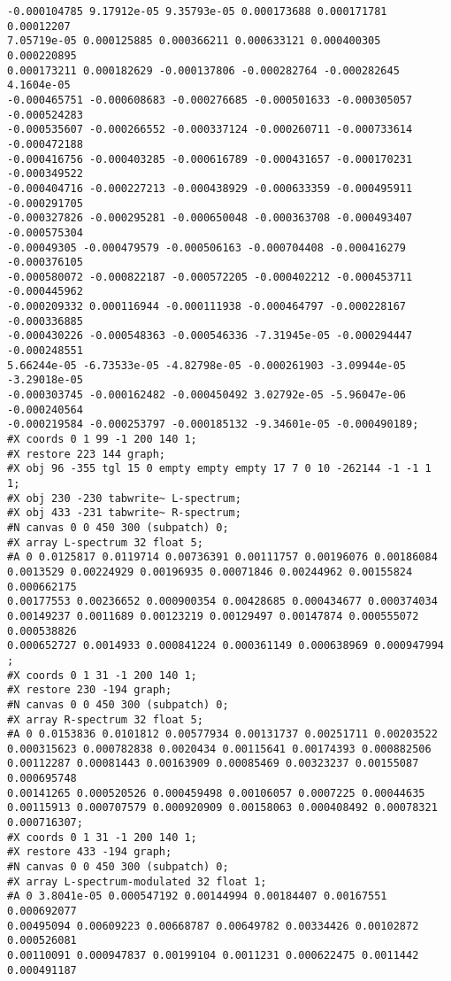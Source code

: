 \begin{itemize}
\begin{verbatim}
-0.000104785 9.17912e-05 9.35793e-05 0.000173688 0.000171781 0.00012207
7.05719e-05 0.000125885 0.000366211 0.000633121 0.000400305 0.000220895
0.000173211 0.000182629 -0.000137806 -0.000282764 -0.000282645 4.1604e-05
-0.000465751 -0.000608683 -0.000276685 -0.000501633 -0.000305057 -0.000524283
-0.000535607 -0.000266552 -0.000337124 -0.000260711 -0.000733614 -0.000472188
-0.000416756 -0.000403285 -0.000616789 -0.000431657 -0.000170231 -0.000349522
-0.000404716 -0.000227213 -0.000438929 -0.000633359 -0.000495911 -0.000291705
-0.000327826 -0.000295281 -0.000650048 -0.000363708 -0.000493407 -0.000575304
-0.00049305 -0.000479579 -0.000506163 -0.000704408 -0.000416279 -0.000376105
-0.000580072 -0.000822187 -0.000572205 -0.000402212 -0.000453711 -0.000445962
-0.000209332 0.000116944 -0.000111938 -0.000464797 -0.000228167 -0.000336885
-0.000430226 -0.000548363 -0.000546336 -7.31945e-05 -0.000294447 -0.000248551
5.66244e-05 -6.73533e-05 -4.82798e-05 -0.000261903 -3.09944e-05 -3.29018e-05
-0.000303745 -0.000162482 -0.000450492 3.02792e-05 -5.96047e-06 -0.000240564
-0.000219584 -0.000253797 -0.000185132 -9.34601e-05 -0.000490189;
#X coords 0 1 99 -1 200 140 1;
#X restore 223 144 graph;
#X obj 96 -355 tgl 15 0 empty empty empty 17 7 0 10 -262144 -1 -1 1
1;
#X obj 230 -230 tabwrite~ L-spectrum;
#X obj 433 -231 tabwrite~ R-spectrum;
#N canvas 0 0 450 300 (subpatch) 0;
#X array L-spectrum 32 float 5;
#A 0 0.0125817 0.0119714 0.00736391 0.00111757 0.00196076 0.00186084
0.0013529 0.00224929 0.00196935 0.00071846 0.00244962 0.00155824 0.000662175
0.00177553 0.00236652 0.000900354 0.00428685 0.000434677 0.000374034
0.00149237 0.0011689 0.00123219 0.00129497 0.00147874 0.000555072 0.000538826
0.000652727 0.0014933 0.000841224 0.000361149 0.000638969 0.000947994
;
#X coords 0 1 31 -1 200 140 1;
#X restore 230 -194 graph;
#N canvas 0 0 450 300 (subpatch) 0;
#X array R-spectrum 32 float 5;
#A 0 0.0153836 0.0101812 0.00577934 0.00131737 0.00251711 0.00203522
0.000315623 0.000782838 0.0020434 0.00115641 0.00174393 0.000882506
0.00112287 0.00081443 0.00163909 0.00085469 0.00323237 0.00155087 0.000695748
0.00141265 0.000520526 0.000459498 0.00106057 0.0007225 0.00044635
0.00115913 0.000707579 0.000920909 0.00158063 0.000408492 0.00078321
0.000716307;
#X coords 0 1 31 -1 200 140 1;
#X restore 433 -194 graph;
#N canvas 0 0 450 300 (subpatch) 0;
#X array L-spectrum-modulated 32 float 1;
#A 0 3.8041e-05 0.000547192 0.00144994 0.00184407 0.00167551 0.000692077
0.00495094 0.00609223 0.00668787 0.00649782 0.00334426 0.00102872 0.000526081
0.00110091 0.000947837 0.00199104 0.0011231 0.000622475 0.0011442 0.000491187

\end{verbatim}
\end{itemize}
